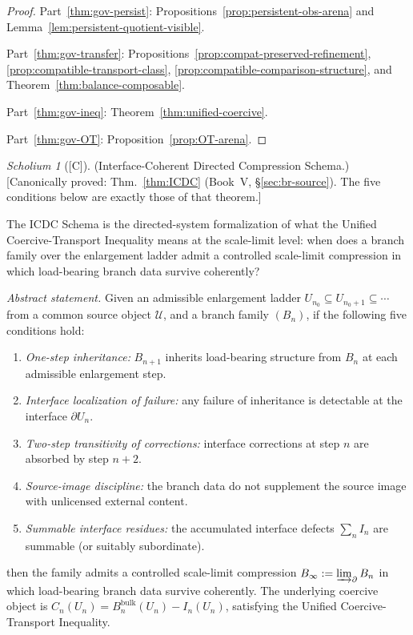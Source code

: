 \documentclass[12pt,oneside]{amsbook}
\theoremstyle{plain}
\theoremstyle{definition}
\theoremstyle{remark}
\newtheorem{scholium}[theorem]{Scholium}
\newcommand{\status}[1]{\textup{[#1]}}
\begin{document}
\begin{proof}
Part~\ref{thm:gov-persist}: Propositions~\ref{prop:persistent-obs-arena}
and Lemma~\ref{lem:persistent-quotient-visible}.

Part~\ref{thm:gov-transfer}: Propositions~\ref{prop:compat-preserved-refinement},
\ref{prop:compatible-transport-class}, \ref{prop:compatible-comparison-structure},
and Theorem~\ref{thm:balance-composable}.

Part~\ref{thm:gov-ineq}: Theorem~\ref{thm:unified-coercive}.

Part~\ref{thm:gov-OT}: Proposition~\ref{prop:OT-arena}.
\end{proof}


\begin{scholium}[\status{C}]\label{sch:icdc-abstract}
\textup{(Interface-Coherent Directed Compression Schema.)}
\textup{[Canonically proved: Thm.~\ref{thm:ICDC} (Book~V, \S\ref{sec:br-source}).  The five conditions below are exactly those of that theorem.]}

The ICDC Schema is the directed-system formalization of what the
Unified Coercive-Transport Inequality means at the scale-limit level:
when does a branch family over the enlargement ladder admit a
controlled scale-limit compression in which load-bearing branch data
survive coherently?

\emph{Abstract statement.}  Given an admissible enlargement ladder
$U_{n_0} \subseteq U_{n_0+1} \subseteq \cdots$ from a common source
object $\mathcal{U}$, and a branch family $(B_n)$, if the following
five conditions hold:
\begin{enumerate}[label=\textup{(\roman*)}]
  \item \emph{One-step inheritance:} $B_{n+1}$ inherits load-bearing
        structure from $B_n$ at each admissible enlargement step.
  \item \emph{Interface localization of failure:} any failure of
        inheritance is detectable at the interface $\partial U_n$.
  \item \emph{Two-step transitivity of corrections:} interface
        corrections at step $n$ are absorbed by step $n+2$.
  \item \emph{Source-image discipline:} the branch data do not
        supplement the source image with unlicensed external content.
  \item \emph{Summable interface residues:} the accumulated interface
        defects $\sum_n I_n$ are summable (or suitably subordinate).
\end{enumerate}
then the family admits a controlled scale-limit compression
$B_\infty := \varinjlim_\partial B_n$ in which load-bearing branch
data survive coherently.  The underlying coercive object is
$C_n(U_n) = B_n^{\mathrm{bulk}}(U_n) - I_n(U_n)$, satisfying the
Unified Coercive-Transport Inequality.


\end{scholium}
\end{document}
